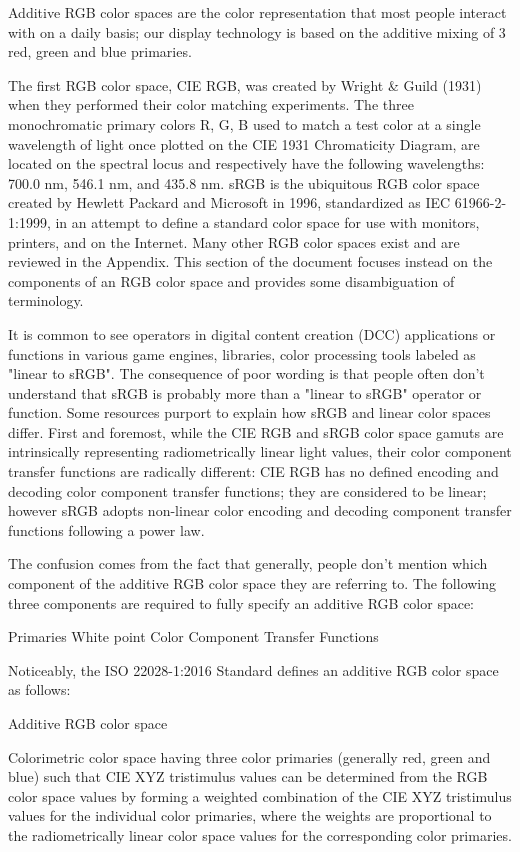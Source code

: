 Additive RGB color spaces are the color representation that most people interact with on a daily basis; our display technology is based on the additive mixing of 3 red, green and blue primaries.

The first RGB color space, CIE RGB, was created by Wright & Guild (1931) when they performed their color matching experiments. The three monochromatic primary colors R, G, B used to match a test color at a single wavelength of light once plotted on the CIE 1931 Chromaticity Diagram, are located on the spectral locus and respectively have the following wavelengths: 700.0 nm, 546.1 nm, and 435.8 nm. sRGB is the ubiquitous RGB color space created by Hewlett Packard and Microsoft in 1996, standardized as IEC 61966-2-1:1999, in an attempt to define a standard color space for use with monitors, printers, and on the Internet. Many other RGB color spaces exist and are reviewed in the Appendix. This section of the document focuses instead on the components of an RGB color space and provides some disambiguation of terminology.

It is common to see operators in digital content creation (DCC) applications or functions in various game engines, libraries, color processing tools labeled as "linear to sRGB". The consequence of poor wording is that people often don't understand that sRGB is probably more than a "linear to sRGB" operator or function. Some resources purport to explain how sRGB and linear color spaces differ.
First and foremost, while the CIE RGB and sRGB color space gamuts are intrinsically representing radiometrically linear light values, their color component transfer functions are radically different: CIE RGB has no defined encoding and decoding color component transfer functions; they are considered to be linear; however sRGB adopts non-linear color encoding and decoding component transfer functions following a power law.

The confusion comes from the fact that generally, people don't mention which component of the additive RGB color space they are referring to. The following three components are required to fully specify an additive RGB color space:

Primaries
White point
Color Component Transfer Functions

Noticeably, the ISO 22028-1:2016 Standard defines an additive RGB color space as follows:

	Additive RGB color space

Colorimetric color space having three color primaries (generally red, green and blue) such that CIE XYZ tristimulus values can be determined from the RGB color space values by forming a weighted combination of the CIE XYZ tristimulus values for the individual color primaries, where the weights are proportional to the radiometrically linear color space values for the corresponding color primaries.

